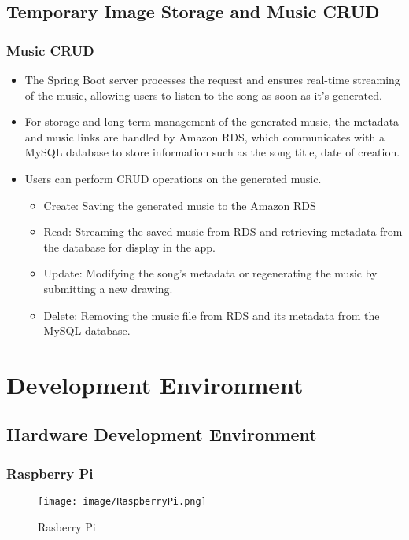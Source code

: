 \documentclass[conference]{IEEEtran}
\begin{document}
\subsection{Temporary Image Storage and Music CRUD}

\subsubsection{Music CRUD}
\begin{itemize}
    \item The Spring Boot server processes the request and ensures real-time streaming of the music, allowing users to listen to the song as soon as it's generated.\\
    \item For storage and long-term management of the generated music, the metadata and music links are handled by Amazon RDS, which communicates with a MySQL database to store information such as the song title, date of creation.\\
    \item Users can perform CRUD operations on the generated music.
\begin{itemize}
    \item Create: Saving the generated music to the Amazon RDS
    \item Read: Streaming the saved music from RDS and retrieving metadata from the database for display in the app.\\
    \item Update: Modifying the song’s metadata or regenerating the music by submitting a new drawing.\\
    \item Delete: Removing the music file from RDS and its metadata from the MySQL database.
\end{itemize}
\end{itemize}

\clearpage

\section{Development Environment}

\subsection{Hardware Development Environment}

\subsubsection{Raspberry Pi}
\begin{figure}[h!]
    \centering
    \texttt{[image: image/RaspberryPi.png]}
\caption{Rasberry Pi}
    \label{fig:enter-label}
\end{figure}
\end{document}
